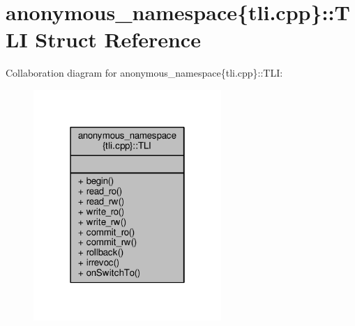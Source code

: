\hypertarget{structanonymous__namespace_02tli_8cpp_03_1_1TLI}{\section{anonymous\-\_\-namespace\{tli.\-cpp\}\-:\-:T\-L\-I Struct Reference}
\label{structanonymous__namespace_02tli_8cpp_03_1_1TLI}
}


Collaboration diagram for anonymous\-\_\-namespace\{tli.\-cpp\}\-:\-:T\-L\-I\-:
\nopagebreak
\begin{figure}[H]
\begin{center}
\leavevmode
\includegraphics[width=202pt]{structanonymous__namespace_02tli_8cpp_03_1_1TLI__coll__graph}
\end{center}
\end{figure}
